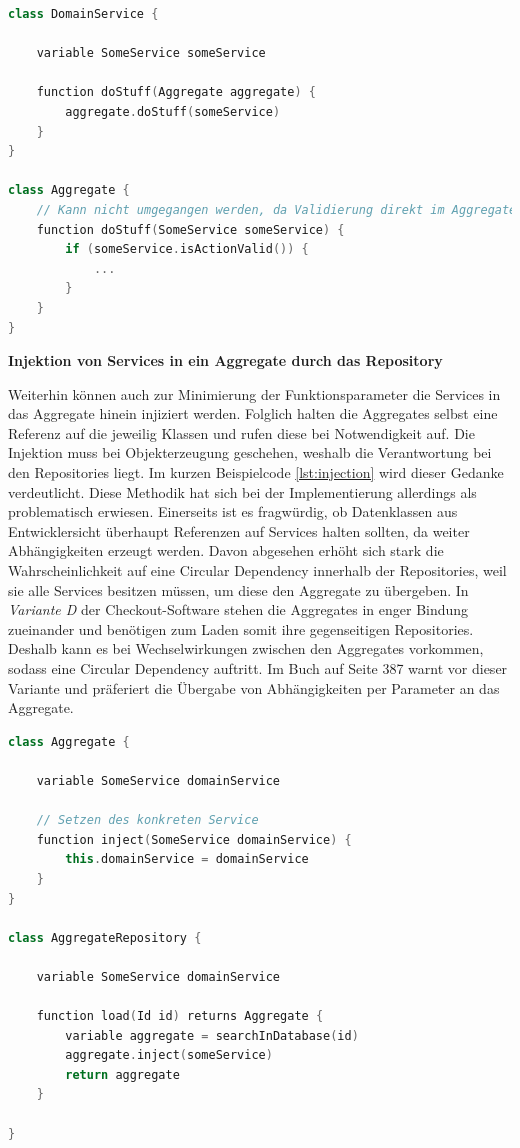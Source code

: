 \begin{minipage}{\linewidth} %
	\begin{lstlisting}[caption={Übergabe der Referenz an das Aggregate als Parameter}, label={lst:parameter}, language=Kotlin]
class DomainService {
	
	variable SomeService someService
	
	function doStuff(Aggregate aggregate) {
		aggregate.doStuff(someService)
	}
}

class Aggregate {
	// Kann nicht umgegangen werden, da Validierung direkt im Aggregate geschieht
	function doStuff(SomeService someService) {
		if (someService.isActionValid()) {
			...
		}
	}
}
	\end{lstlisting}
\end{minipage}

\textbf{Injektion von Services in ein Aggregate durch das Repository}

Weiterhin können auch zur Minimierung der Funktionsparameter die Services in das Aggregate hinein injiziert werden. Folglich halten die Aggregates selbst eine Referenz auf die jeweilig Klassen und rufen diese bei Notwendigkeit auf. Die Injektion muss bei Objekterzeugung geschehen, weshalb die Verantwortung bei den Repositories liegt. Im kurzen Beispielcode \ref{lst:injection} wird dieser Gedanke verdeutlicht. Diese Methodik hat sich bei der Implementierung allerdings als problematisch erwiesen. Einerseits ist es fragwürdig, ob Datenklassen aus Entwicklersicht überhaupt Referenzen auf Services halten sollten, da weiter Abhängigkeiten erzeugt werden. Davon abgesehen erhöht sich stark die Wahrscheinlichkeit auf eine Circular Dependency innerhalb der Repositories, weil sie alle Services besitzen müssen, um diese den Aggregate zu übergeben. In \emph{Variante D} der Checkout-Software stehen die Aggregates in enger Bindung zueinander und benötigen zum Laden somit ihre gegenseitigen Repositories. Deshalb kann es bei Wechselwirkungen zwischen den Aggregates vorkommen, sodass eine Circular Dependency auftritt. Im Buch  auf Seite 387 warnt \citeauthor{Vernon.2015} vor dieser Variante und präferiert die Übergabe von Abhängigkeiten per Parameter an das Aggregate.

\begin{minipage}{\linewidth} %
	\begin{lstlisting}[caption={Injektion des Services in ein Aggregate durch das Repository}, label={lst:injection}, language=Kotlin]
class Aggregate {
	
	variable SomeService domainService
	
	// Setzen des konkreten Service
	function inject(SomeService domainService) {
		this.domainService = domainService
	}
}

class AggregateRepository {
	
	variable SomeService domainService
	
	function load(Id id) returns Aggregate {
		variable aggregate = searchInDatabase(id)
		aggregate.inject(someService)
		return aggregate
	}
	
}
	\end{lstlisting}
\end{minipage}


